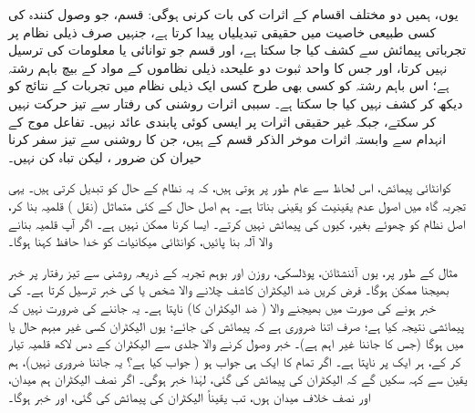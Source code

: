 یوں،  ہمیں دو  مختلف اقسام کے  اثرات کی بات کرنی ہوگی:   قسم،  جو وصول کنندہ کی کسی طبیعی خاصیت میں حقیقی تبدیلیاں پیدا کرتا ہے،  جنہیں صرف ذیلی نظام پر تجرباتی پیمائش سے کشف کیا جا سکتا ہے، اور  قسم  جو توانائی یا معلومات کی ترسیل نہیں کرتا،  اور جس کا  واحد ثبوت دو علیحدہ ذیلی نظاموں کے مواد کے بیچ باہم رشتہ ہے؛  اس باہم رشتہ کو کسی بھی طرح کسی ایک ذیلی نظام میں تجربات کے نتائج کو دیکھ کر کشف نہیں کیا جا سکتا ہے۔ سببی اثرات  روشنی کی رفتار سے تیز حرکت نہیں کر سکتے،  جبکہ غیر حقیقی   اثرات پر ایسی کوئی پابندی عائد نہیں۔ تفاعل موج کے انہدام سے وابستہ اثرات موخر الذکر قسم کے  ہیں،  جن  کا روشنی سے تیز سفر کرنا حیران کن ضرور ،  لیکن تباہ کن نہیں۔

کوانٹائی پیمائش،  اس لحاظ سے  عام طور پر   ہوتی ہیں، کہ  یہ  نظام کے حال کو تبدیل کرتی ہیں۔ یہی تجربہ گاہ میں اصول عدم یقینیت کو یقینی بناتا ہے۔  ہم  اصل حال کے  کئی متماثل        (نقل ) قلمیہ بنا کر،  اصل نظام کو چھوئے بغیر، کیوں   کی پیمائش نہیں کرتے۔ ایسا کرنا ممکن نہیں ہے۔ اگر آپ قلمیہ بنانے والا  آلہ  بنا پائیں، کوانٹائی میکانیات کو خدا حافظ کہنا ہوگا۔

مثال کے طور پر، یوں   آئنشٹائن، پوڈلسکی، روزن اور بوہم تجربہ کے ذریعہ روشنی سے تیز رفتار پر خبر بھیجنا ممکن ہوگا۔  فرض کریں ضد الیکٹران کاشف چلانے والا شخص  یا    کی خبر ترسیل کرتا ہے۔   کی خبر   ہونے کی صورت میں بھیجنے والا ( ضد الیکٹران کا)   ناپتا ہے۔  یہ جاننے کی ضرورت نہیں کہ پیمائشی نتیجہ کیا ہے؛  صرف اتنا  ضروری ہے کہ پیمائش کی جائے؛ یوں الیکٹران کسی غیر مبہم حال  یا  میں ہوگا  (جس کا جاننا غیر اہم ہے)۔ خبر وصول کرنے والا جلدی سے الیکٹران کے  دس لاکھ قلمیہ تیار کر کے،  ہر ایک پر   ناپتا ہے۔   اگر تمام کا ایک ہی جواب ہو (  جواب کیا ہے؟  یہ جاننا ضروری نہیں)،  ہم یقین سے کہہ سکیں گے کہ الیکٹران کی پیمائش کی گئی،  لہٰذا خبر   ہوگی۔  اگر نصف الیکٹران ہم میدان،  اور نصف خلاف میدان ہوں،  تب یقیناً الیکٹران کی پیمائش  کی گئی،  اور   خبر   ہوگا۔


